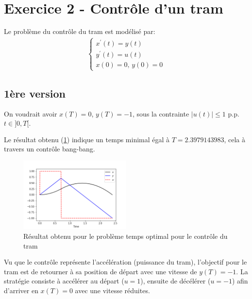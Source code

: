 \documentclass[
	french,
	11pt, %
]{fphw}
\begin{document}
\clearpage


\section*{Exercice 2 - Contrôle d'un tram}

\begin{problem}
	Le problème du contrôle du tram est modélisé par:
	\begin{align}
		\begin{cases}
			x^\prime(t) = y(t) \\
			y^\prime(t) = u(t) \\
			x(0)=0,\, y(0)=0
		\end{cases}
		\label{eq:exo3}
	\end{align}	

\end{problem}


\subsection*{1ère version}
On voudrait avoir $x(T)=0$, $y(T)=-1$, sous la contrainte $\vert u(t) \vert \leq 1$ p.p. $t \in ]0,T[$.
 
Le résultat obtenu (\cref{fig:Exo21}) indique un temps minimal égal à $T=2.3979143983$, cela à travers un contrôle bang-bang.
\begin{figure}[H]
    \centering
    \includegraphics[width=0.5\textwidth]{Exo2Ver1.png}
	\caption{Résultat obtenu pour le problème temps optimal pour le contrôle du tram}
	\label{fig:Exo21}
\end{figure}
Vu que le contrôle représente l'accélération (puissance du tram), l'objectif pour le tram est de retourner à sa position de départ avec une vitesse de $y(T)=-1$. La stratégie consiste à accélérer au départ ($u=1$), ensuite de décélérer ($u=-1$) afin d'arriver en $x(T)=0$ avec une vitesse réduites.
\end{document}
